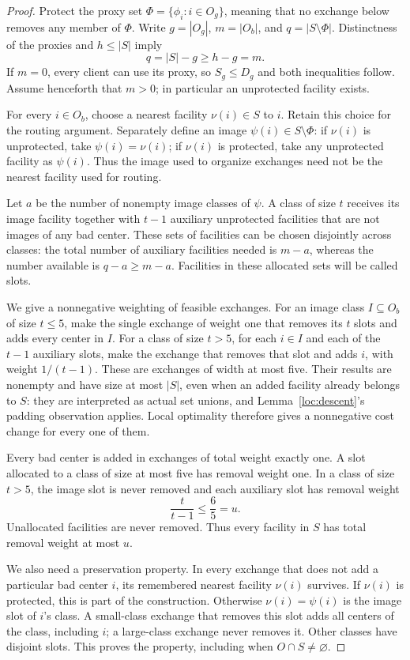 \begin{proof}
Protect the proxy set $\Phi=\{\phi_i:i\in O_g\}$, meaning that no exchange
below removes any member of $\Phi$.  Write $g=|O_g|$, $m=|O_b|$, and
$q=|S\setminus\Phi|$.  Distinctness of the proxies and $h\le|S|$ imply
\[
 q=|S|-g\ge h-g=m.
\]
If $m=0$, every client can use its proxy, so $S_g\le D_g$ and both
inequalities follow.  Assume henceforth that $m>0$; in particular an
unprotected facility exists.

For every $i\in O_b$, choose a nearest facility $\nu(i)\in S$ to $i$.
Retain this choice for the routing argument.  Separately define an image
$\psi(i)\in S\setminus\Phi$: if $\nu(i)$ is unprotected, take
$\psi(i)=\nu(i)$; if $\nu(i)$ is protected, take any unprotected facility
as $\psi(i)$.  Thus the image used to organize exchanges need not be the
nearest facility used for routing.

Let $a$ be the number of nonempty image classes of $\psi$.  A class of
size $t$ receives its image facility together with $t-1$ auxiliary
unprotected facilities that are not images of any bad center.  These sets
of facilities can be chosen disjointly across classes: the total number
of auxiliary facilities needed is $m-a$, whereas the number available is
$q-a\ge m-a$.  Facilities in these allocated sets will be called slots.

We give a nonnegative weighting of feasible exchanges.  For an image
class $I\subseteq O_b$ of size $t\le5$, make the single exchange of weight
one that removes its $t$ slots and adds every center in $I$.  For a class
of size $t>5$, for each $i\in I$ and each of the $t-1$ auxiliary slots,
make the exchange that removes that slot and adds $i$, with weight
$1/(t-1)$.  These are exchanges of width at most five.  Their results are
nonempty and have size at most $|S|$, even when an added facility already
belongs to $S$: they are interpreted as actual set unions, and
Lemma~\ref{loc:descent}'s padding observation applies.  Local optimality
therefore gives a nonnegative cost change for every one of them.

Every bad center is added in exchanges of total weight exactly one.  A
slot allocated to a class of size at most five has removal weight one.
In a class of size $t>5$, the image slot is never removed and each
auxiliary slot has removal weight
\[
 \frac{t}{t-1}\le\frac65=u.
\]
Unallocated facilities are never removed.  Thus every facility in $S$
has total removal weight at most $u$.

We also need a preservation property.  In every exchange that does not
add a particular bad center $i$, its remembered nearest facility
$\nu(i)$ survives.  If $\nu(i)$ is protected, this is part of the
construction.  Otherwise $\nu(i)=\psi(i)$ is the image slot of $i$'s
class.  A small-class exchange that removes this slot adds all centers
of the class, including $i$; a large-class exchange never removes it.
Other classes have disjoint slots.  This proves the property, including
when $O\cap S\ne\varnothing$.


\end{proof}
